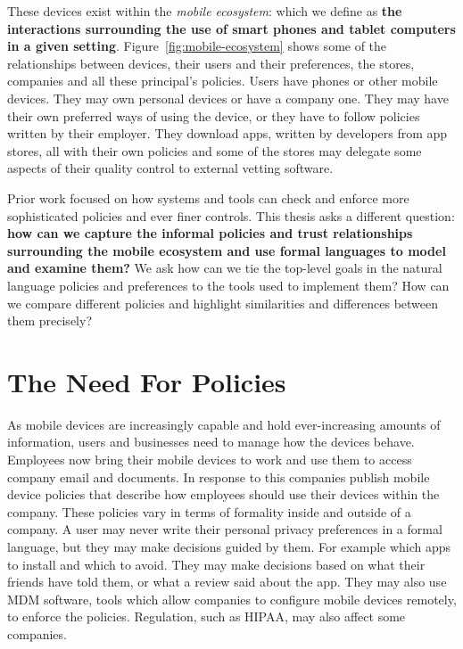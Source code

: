 \documentclass[thesis.tex]{subfiles}
\begin{document}
These devices exist within the \emph{mobile ecosystem}: which we define as
\textbf{the interactions surrounding the use of smart phones and tablet
computers in a given setting}. Figure~\ref{fig:mobile-ecosystem} shows some of the relationships
between devices, their users and their preferences, the stores, companies and
all these principal's policies. Users have phones or other mobile devices. They
may own personal devices or have a company one. They may have their own
preferred ways of using the device, or they have to follow policies written
by their employer. They download apps, written by developers from app stores,
all with their own policies and some of the stores may delegate some aspects of
their quality control to external vetting software.

Prior work focused on how systems and tools can check and enforce more
sophisticated policies and ever finer controls. This thesis asks a different
question: \textbf{how can we capture the informal policies and trust
relationships surrounding the mobile ecosystem and use formal languages to model
and examine them?} We ask how can we tie the top-level goals in the natural
language policies and preferences to the tools used to implement them? How can
we compare different policies and highlight similarities and differences between
them precisely?

\section{The Need For Policies}

As mobile devices are increasingly capable and hold ever-increasing amounts of
information, users and businesses need to manage how the devices behave.
Employees now bring their mobile devices to work and use them to access company
email and documents. In response to this companies publish mobile device
policies that describe how employees should use their devices within the
company. These policies vary in terms of formality inside and outside of a
company. A user may never write their personal privacy preferences in a formal
language, but they may make decisions guided by them. For example which apps to
install and which to avoid. They may make decisions based on what their friends
have told them, or what a review said about the app. They may also use \ac{MDM}
software, tools which allow companies to configure mobile devices remotely, to
enforce the policies. Regulation, such as \ac{HIPAA}, may also affect some
companies.
\end{document}
